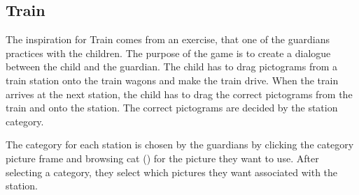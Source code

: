 \subsection{Train}
\label{sub:train}
The inspiration for Train comes from an exercise, that one of the guardians practices with the children. The purpose of the game is to create a dialogue between the child and the guardian. The child has to drag pictograms from a train station onto the train wagons and make the train drive. When the train arrives at the next station, the child has to drag the correct pictograms from the train and onto the station. The correct pictograms are decided by the station category.

The category for each station is chosen by the guardians by clicking the category picture frame and browsing \ac{cat} () for the picture they want to use. After selecting a category, they select which pictures they want associated with the station. %
